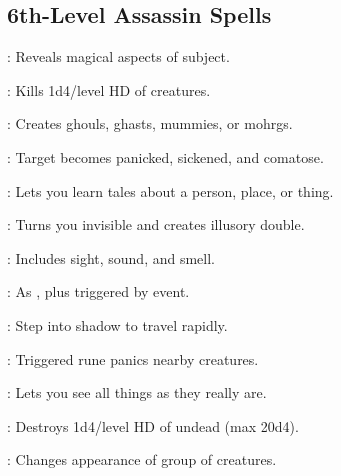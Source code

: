 \begin{multicols}{2}
\subsection{6th-Level Assassin Spells}
\begin{description*}
\item[\linkspell{Analyze Dweomer}:] Reveals magical aspects of subject.
\item[\linkspell{Circle of Death}:] Kills 1d4/level HD of creatures.
\item[\linkspell{Create Undead}:] Creates ghouls, ghasts, mummies, or mohrgs.
\item[\linkspell{Eyebite}:] Target becomes panicked, sickened, and comatose.
\item[\linkspell{Legend Lore}:] Lets you learn tales about a person, place, or thing.
\item[\linkspell{Mislead}:] Turns you invisible and creates illusory double.
\item[\linkspell{Permanent Image}:] Includes sight, sound, and smell.
\item[\linkspell{Programmed Image}:] As , plus triggered by event.
\item[\linkspell{Shadow Walk}:] Step into shadow to travel rapidly.
\item[\linkspell{Symbol of Fear}:] Triggered rune panics nearby creatures.
\item[\linkspell{True Seeing}:] Lets you see all things as they really are.
\item[\linkspell{Undeath to Death}:] Destroys 1d4/level HD of undead (max 20d4).
\item[\linkspell{Veil}:] Changes appearance of group of creatures.
\end{description*}

\end{multicols}
